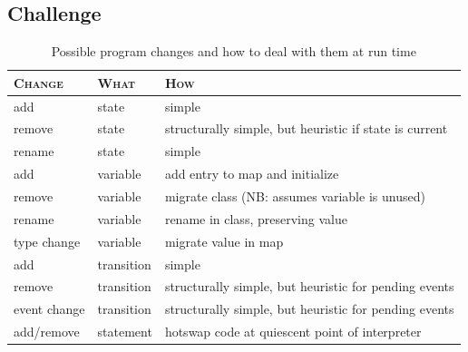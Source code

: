 \documentclass[english,submission]{programming}
\begin{document}
\subsection{Challenge}

\begin{table}[t]
  \centering
\begin{tabular}{lll}\toprule
\textsc{Change} & \textsc{What} & \textsc{How}\\\midrule
add & state & simple  \\
remove & state & structurally simple, but heuristic if state is current \\
rename & state & simple\\
add & variable & add entry to map and initialize \\
remove & variable & migrate class (NB: assumes variable is unused)\\
rename & variable & rename in class, preserving value\\
type change & variable & migrate value in map \\
add & transition & simple \\
remove & transition & structurally simple, but heuristic for pending events\\
event change & transition & structurally simple, but heuristic for pending events\\
add/remove & statement & hotswap code at quiescent point of interpreter\\
\bottomrule
\end{tabular}
\caption{Possible program changes and how to deal with them at run time}
\label{tbl:smchanges}
\end{table}
\end{document}
